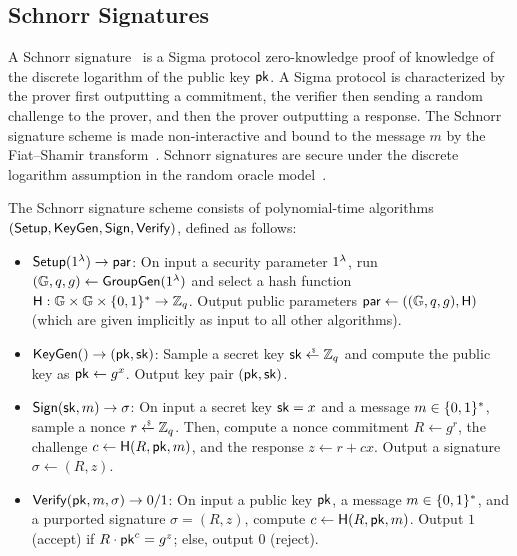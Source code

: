 \subsection{Schnorr Signatures}
\label{background:schnorr}

A Schnorr signature~\cite{Schnorr91} is a Sigma protocol zero-knowledge proof of knowledge of the discrete logarithm of the public key $\mathsf{pk}$.
A Sigma protocol is characterized by the prover first outputting a commitment,
the verifier then sending a random challenge to the prover,
and then the prover outputting a response.
The Schnorr signature scheme is made non-interactive and bound to the message $m$ by the Fiat--Shamir transform~\cite{FiatS86}.
Schnorr signatures are secure under the discrete logarithm assumption in the random oracle model~\cite{PointchevalS00}.


\begin{definition} \label{defn:schnorr}
The Schnorr signature scheme consists of polynomial-time algorithms $(\mathsf{Setup}, \mathsf{KeyGen}, \mathsf{Sign}, \mathsf{Verify})$, defined as follows:

  \begin{itemize}

    \item $\mathsf{Setup}(1^\lambda) \rightarrow \mathsf{par}$:
    On input a security parameter $1^\lambda$,
    run $(\mathbb{G}, q, g) \gets \mathsf{GroupGen}(1^{\lambda})$ and select a hash function
    $\mathsf{H} : \mathbb{G} \times \mathbb{G} \times \{ 0, 1\}^* \rightarrow \mathbb{Z}_q$.
    Output public parameters $\mathsf{par} \gets ((\mathbb{G}, q, g), \mathsf{H})$ (which are given implicitly as input to all other algorithms).

  \item $\mathsf{KeyGen}() \rightarrow (\mathsf{pk}, \mathsf{sk})$:
  Sample a secret key $\sk \randpick \Zq$ and compute the public key as $\mathsf{pk} \gets g^x$.
    Output key pair $(\mathsf{pk}, \mathsf{sk})$.

  \item $\mathsf{Sign}(\mathsf{sk}, m) \rightarrow \sigma$:
    On input a secret key $\mathsf{sk} = x$ and a message $m \in \{ 0, 1\}^*$,
    sample a nonce $r \randpick \Zq$. Then, compute a
    nonce commitment $R \gets g^r$, the challenge $c \gets \mathsf{H}(R, \mathsf{pk}, m)$, and the
    response $z \gets r + cx$. Output a signature $\sigma \gets (R,z)$.

  \item $\mathsf{Verify}(\mathsf{pk}, m, \sigma) \rightarrow 0/1$:
  On input a public key $\mathsf{pk}$,
    a message $m \in \{ 0, 1\}^*$,
    and a purported signature $\sigma = (R, z)$, compute $c
    \leftarrow \mathsf{H}(R, \mathsf{pk}, m)$.
    Output $1$ (accept) if $R \cdot \mathsf{pk}^c = g^z$; else, output $0$ (reject).

\end{itemize}
\end{definition}



